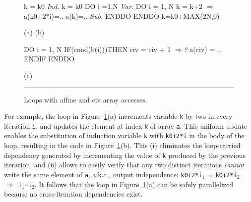 \documentclass{sig-alternate}
\newcommand{\emp}[1]{\textcolor{DikuRed}{ #1}}
\newcommand{\emphh}[1]{\textcolor{CosGreen}{ #1}}
\newcommand{\mymath}[1]{$ #1 $}
\begin{document}

\begin{figure}
\begin{minipage}{0.58\columnwidth}
\begin{colorcode}
k = k0     \emphh{\em Ind.}  k = k0        
DO i =1,N  \emphh{\em Var.}  DO i = 1, N      
  k = k+2    \emphh{\mymath{\Rightarrow}}    a(k0+2*i)=.. 
  a(k)=..  \emphh{\em Sub.}  ENDDO         
ENDDO            k=k0+MAX(2N,0)

   (a)               (b) 

\end{colorcode}
\end{minipage}
\begin{minipage}{0.35\columnwidth}
\begin{colorcode}
DO i = 1, N
 IF(cond(b(i)))THEN 
    civ = civ + 1 \emp{\mymath{\Rightarrow}{\em ?}} 
    a(civ) = ...
ENDIF ENDDO

      (c)

\end{colorcode}
\end{minipage}
\hrule
\caption{Loops with affine and {\sc civ} array accesses.}
\label{fig:introEg}
\vspace{-2ex}
\end{figure}


For example, the loop in Figure~\ref{fig:introEg}(a) increments 
variable {\tt k} by two in every iteration {\tt i}, and updates 
the element at index {\tt k} of array {\tt a}. %
%
This uniform update enables the substitution of induction variable
{\tt k} with {\tt k0+2*i} in the body of the loop, resulting in the 
code in Figure~\ref{fig:introEg}(b).
%
This (i) eliminates the loop-carried dependency generated by incrementing the value
of {\tt k} produced by the previous iteration, and (ii) allows to easily verify
that any two distinct iterations {\em cannot} write the same element of {\tt a},
a.k.a., output independence: {\tt k0+2*i$_1$~=~k0+2*i$_2$ $\Rightarrow$ i$_1$=i$_2$}. 
It follows that the loop in Figure~\ref{fig:introEg}(a) can be safely
parallelized because no cross-iteration dependencies exist. 
%
\end{document}
